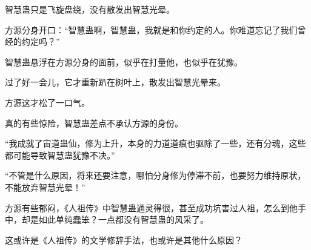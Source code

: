 \begin{this_body}
智慧蛊只是飞旋盘绕，没有散发出智慧光晕。

方源分身开口：“智慧蛊啊，智慧蛊，我就是和你约定的人。你难道忘记了我们曾经的约定吗？”

智慧蛊悬浮在方源分身的面前，似乎在打量他，也似乎在犹豫。

过了好一会儿，它才重新趴在树叶上，散发出智慧光晕来。

方源这才松了一口气。

真的有些惊险，智慧蛊差点不承认方源的身份。

“我成就了宙道蛊仙，修为上升，本身的力道道痕也驱除了一些，还有分魂，这些都可能导致智慧蛊犹豫不决。”

“不管是什么原因，将来还要注意，哪怕分身修为停滞不前，也要努力维持原状，不能放弃智慧光晕！”

方源有些郁闷，《人祖传》中智慧蛊通灵得很，甚至成功坑害过人祖，怎么到他手中，却是如此单纯蠢笨？一点都没有智慧蛊的风采了。

这或许是《人祖传》的文学修辞手法，也或许是其他什么原因？

\end{this_body}

